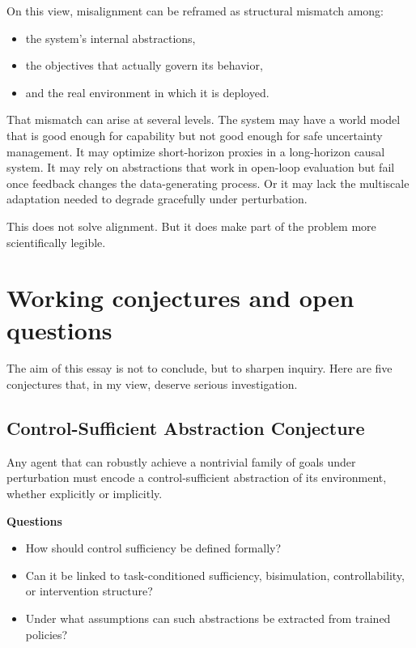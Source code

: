 \documentclass[11pt]{article}
\begin{document}
On this view, misalignment can be reframed as structural mismatch among:

\begin{itemize}
\item the system's internal abstractions,
\item the objectives that actually govern its behavior,
\item and the real environment in which it is deployed.

\end{itemize}

That mismatch can arise at several levels. The system may have a world model that is good enough for capability but not good enough for safe uncertainty management. It may optimize short-horizon proxies in a long-horizon causal system. It may rely on abstractions that work in open-loop evaluation but fail once feedback changes the data-generating process. Or it may lack the multiscale adaptation needed to degrade gracefully under perturbation.

This does not solve alignment. But it does make part of the problem more scientifically legible.

\section{Working conjectures and open questions}


The aim of this essay is not to conclude, but to sharpen inquiry. Here are five conjectures that, in my view, deserve serious investigation.

\subsection{Control-Sufficient Abstraction Conjecture}

Any agent that can robustly achieve a nontrivial family of goals under perturbation must encode a control-sufficient abstraction of its environment, whether explicitly or implicitly.

\textbf{Questions}
\begin{itemize}
\item How should control sufficiency be defined formally?
\item Can it be linked to task-conditioned sufficiency, bisimulation, controllability, or intervention structure?
\item Under what assumptions can such abstractions be extracted from trained policies?

\end{itemize}
\end{document}
